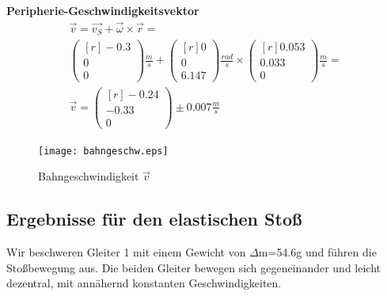 \documentclass{article}
\begin{document}
\textbf{Peripherie-Geschwindigkeitsvektor}
\begin{gather*}
\vec{v}=\vec{v_S}+\vec{\omega}\times \vec{r} =\\
\begin{pmatrix*}[r]
-0.3 \\ 0 \\ 0
\end{pmatrix*}\frac{m}{s}
+ \begin{pmatrix*}[r]
0 \\ 0 \\ 6.147	
\end{pmatrix*}\frac{rad}{s}
\times
\begin{pmatrix*}[r]
0.053 \\ 0.033 \\ 0	
\end{pmatrix*}\frac{m}{s}
=
\\
\vec{v}=\begin{pmatrix*}[r]
-0.24 \\ -0.33 \\ 0	
\end{pmatrix*} \pm 0.007 \frac{m}{s}
\end{gather*}
\begin{figure}[H]
\caption{Bahngeschwindigkeit $\vec{v}$}
\begin{center}
\texttt{[image: bahngeschw.eps]}
\end{center}
\end{figure}

\subsection{Ergebnisse für den elastischen Stoß}

Wir beschweren Gleiter 1 mit einem Gewicht von $\Delta$m=54.6g und führen die Stoßbewegung aus. Die beiden Gleiter bewegen sich gegeneinander und leicht dezentral, mit annähernd konstanten Geschwindigkeiten. \\
\end{document}

